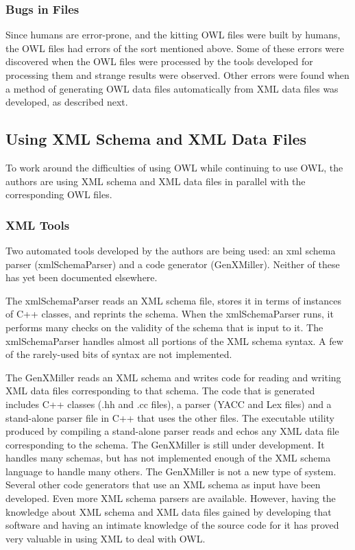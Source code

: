 \subsubsection{Bugs in Files}

Since humans are error-prone, and the kitting OWL files were built by
humans, the OWL files had errors of the sort mentioned above. Some of these
errors were discovered when the OWL files were processed by the tools
developed for processing them and strange results were observed. Other
errors were found when a method of generating OWL data files automatically
from XML data files was developed, as described next.

\subsection{Using XML Schema and XML Data Files}

To work around the difficulties of using OWL while continuing to use OWL,
the authors are using XML schema and XML data files in parallel with the
corresponding OWL files.\\

\subsubsection{XML Tools}

Two automated tools developed by the authors are being used: an xml schema
parser (xmlSchemaParser) and a code generator (GenXMiller).  Neither of
these has yet been documented elsewhere.

The xmlSchemaParser reads an XML schema file, stores it in terms of
instances of C++ classes, and reprints the schema. When the xmlSchemaParser
runs, it performs many checks on the validity of the schema that is input
to it. The xmlSchemaParser handles almost all portions of the XML schema
syntax. A few of the rarely-used bits of syntax are not implemented.

The GenXMiller reads an XML schema and writes code for reading and writing
XML data files corresponding to that schema. The code that is generated
includes C++ classes (.hh and .cc files), a parser (YACC and Lex files) and
a stand-alone parser file in C++ that uses the other files.  The executable
utility produced by compiling a stand-alone parser reads and echos any XML
data file corresponding to the schema. The GenXMiller is still under
development. It handles many schemas, but has not implemented enough of
the XML schema language to handle many others. The GenXMiller is not a
new type of system. Several other code generators that use an XML schema
as input have been developed. Even more XML schema parsers are
available. However, having the knowledge about XML schema and XML data
files gained by developing that software and having an intimate knowledge
of the source code for it has proved very valuable in using XML to deal
with OWL.

